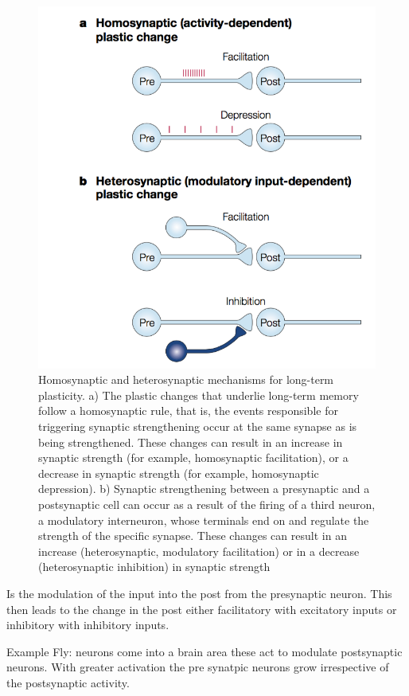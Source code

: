 \documentclass[main]{subfiles}
\begin{document}
\begin{figure}[H]
    \centering
    \includegraphics[width=.8\textwidth]{03_PlasticityInTheBrain/figures/homostatic_heterostatic.png}
    \caption{Homosynaptic and heterosynaptic mechanisms for long-term plasticity. a) The plastic changes that underlie long-term memory follow a homosynaptic rule, that is, the events responsible for triggering synaptic strengthening occur at the same synapse as is being strengthened. These changes can result in an increase in synaptic strength (for example, homosynaptic facilitation), or a decrease in synaptic strength (for example, homosynaptic depression). b) Synaptic strengthening between a presynaptic and a postsynaptic cell can occur as a result of the firing of a third neuron, a modulatory interneuron, whose terminals end on and regulate the strength of the specific synapse. These changes can result in an increase (heterosynaptic, modulatory facilitation) or in a decrease (heterosynaptic inhibition) in synaptic strength}
    \label{fig:syn_plas1t}
\end{figure}

Is the modulation of the input into the post from the presynaptic neuron. This then leads to the change in the post either facilitatory with excitatory inputs or inhibitory with inhibitory inputs. 

Example Fly: neurons come into a brain area these act to modulate postsynaptic neurons. With greater activation the pre synatpic neurons grow irrespective of the postsynaptic activity.
\end{document}
